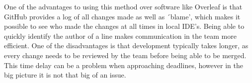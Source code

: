 One of the advantages to using this method over software like Overleaf is that GitHub provides a log of all changes made
as well as ´blame', which makes it possible to see who made the changes at all times in local IDE's.
Being able to quickly identify the author of a line makes communication in the team more efficient.
One of the disadvantages is that development typically takes longer, as every change needs to be reviewed by the team
before being able to be merged.
This time delay can be a problem when approaching deadlines, however in the big picture it is not that big of an issue.
